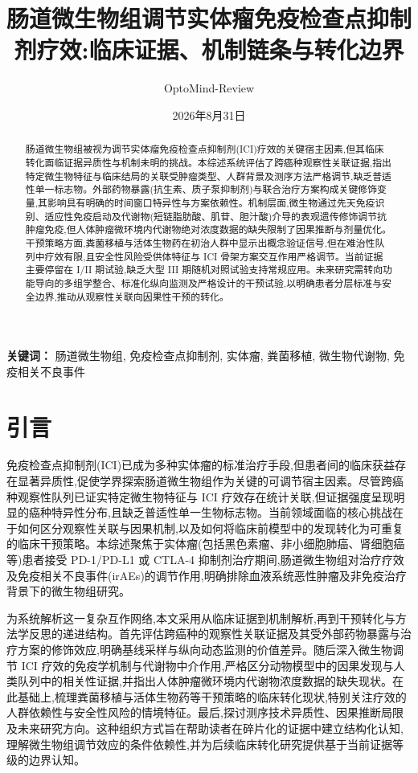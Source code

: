 \documentclass[11pt]{article}
\title{肠道微生物组调节实体瘤免疫检查点抑制剂疗效:临床证据、机制链条与转化边界}
\author{OptoMind-Review}
\date{2026年8月31日}
\begin{document}
\maketitle

\begin{abstract}
肠道微生物组被视为调节实体瘤免疫检查点抑制剂(ICI)疗效的关键宿主因素,但其临床转化面临证据异质性与机制未明的挑战。本综述系统评估了跨癌种观察性关联证据,指出特定微生物特征与临床结局的关联受肿瘤类型、人群背景及测序方法严格调节,缺乏普适性单一标志物。外部药物暴露(抗生素、质子泵抑制剂)与联合治疗方案构成关键修饰变量,其影响具有明确的时间窗口特异性与方案依赖性。机制层面,微生物通过先天免疫识别、适应性免疫启动及代谢物(短链脂肪酸、肌苷、胆汁酸)介导的表观遗传修饰调节抗肿瘤免疫,但人体肿瘤微环境内代谢物绝对浓度数据的缺失限制了因果推断与剂量优化。干预策略方面,粪菌移植与活体生物药在初治人群中显示出概念验证信号,但在难治性队列中疗效有限,且安全性风险受供体特征与 ICI 骨架方案交互作用严格调节。当前证据主要停留在 I/II 期试验,缺乏大型 III 期随机对照试验支持常规应用。未来研究需转向功能导向的多组学整合、标准化纵向监测及严格设计的干预试验,以明确患者分层标准与安全边界,推动从观察性关联向因果性干预的转化。
\end{abstract}

\noindent\textbf{关键词：} 肠道微生物组, 免疫检查点抑制剂, 实体瘤, 粪菌移植, 微生物代谢物, 免疫相关不良事件

\section{引言}\label{ux5f15ux8a00}

免疫检查点抑制剂(ICI)已成为多种实体瘤的标准治疗手段,但患者间的临床获益存在显著异质性,促使学界探索肠道微生物组作为关键的可调节宿主因素。尽管跨癌种观察性队列已证实特定微生物特征与 ICI 疗效存在统计关联,但证据强度呈现明显的癌种特异性分布,且缺乏普适性单一生物标志物。当前领域面临的核心挑战在于如何区分观察性关联与因果机制,以及如何将临床前模型中的发现转化为可重复的临床干预策略。本综述聚焦于实体瘤(包括黑色素瘤、非小细胞肺癌、肾细胞癌等)患者接受 PD-1/PD-L1 或 CTLA-4 抑制剂治疗期间,肠道微生物组对治疗疗效及免疫相关不良事件(irAEs)的调节作用,明确排除血液系统恶性肿瘤及非免疫治疗背景下的微生物组研究。

为系统解析这一复杂互作网络,本文采用从临床证据到机制解析,再到干预转化与方法学反思的递进结构。首先评估跨癌种的观察性关联证据及其受外部药物暴露与治疗方案的修饰效应,明确基线采样与纵向动态监测的价值差异。随后深入微生物调节 ICI 疗效的免疫学机制与代谢物中介作用,严格区分动物模型中的因果发现与人类队列中的相关性证据,并指出人体肿瘤微环境内代谢物浓度数据的缺失现状。在此基础上,梳理粪菌移植与活体生物药等干预策略的临床转化现状,特别关注疗效的人群依赖性与安全性风险的情境特征。最后,探讨测序技术异质性、因果推断局限及未来研究方向。这种组织方式旨在帮助读者在碎片化的证据中建立结构化认知,理解微生物组调节效应的条件依赖性,并为后续临床转化研究提供基于当前证据等级的边界认知。
\end{document}
